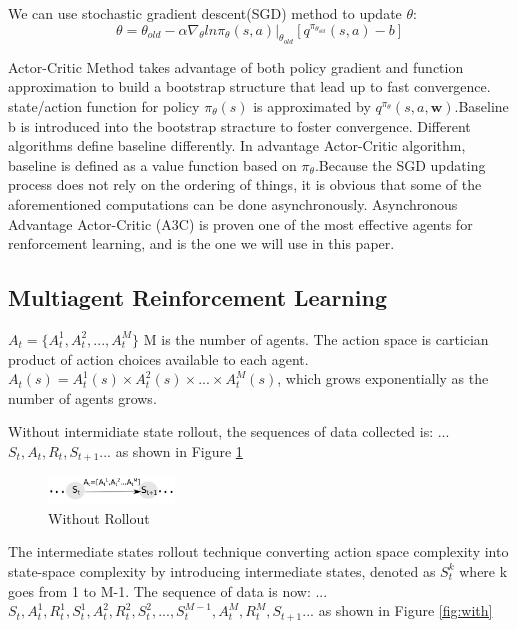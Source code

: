 \documentclass[journal]{IEEEtran}
\begin{document}
We can use stochastic gradient descent(SGD) method to update $\theta$:
\begin{equation}
    \theta=\theta_{old}-\alpha \nabla_{\theta}ln\pi_{\theta}(s,a)|_{\theta_{old}}[q^{\pi_{\theta_{old}}}(s,a)-b]
\end{equation}

Actor-Critic Method takes advantage of both policy gradient and function approximation to build a bootstrap structure that lead up to fast convergence. state/action function for policy $\pi_{\theta}(s)$ is approximated by $q^{\pi_{\theta}}(s,a,\textbf{w})$.Baseline b is introduced into the bootstrap stracture to foster convergence. Different algorithms define baseline differently. In advantage Actor-Critic algorithm, baseline is defined as a value function based on $\pi_{\theta}$.Because the SGD updating process does not rely on the ordering of things, it is obvious that some of the aforementioned computations can be done asynchronously. Asynchronous Advantage Actor-Critic (A3C) is proven one of the most effective agents for renforcement learning, and is the one we will use in this paper.

\subsection{Multiagent Reinforcement Learning}
$A_t=\{A_t^1,A_t^2,...,A_t^M\}$ M is the number of agents. The action space is cartician product of action choices available to each agent. $A_t(s)=A_t^1(s) \times A_t^2(s) \times ... \times A_t^M(s)$, which grows exponentially as the number of agents grows.


Without intermidiate state rollout, the sequences of data collected is:
...$S_t, A_t, R_t, S_{t+1}$... as shown in Figure \ref{fig:without}

\begin{figure}[H]
\centering
\includegraphics[width=0.3\textwidth]{without.png}
\caption{Without Rollout}
\label{fig:without}
\end{figure}

The intermediate states rollout technique converting action space complexity into state-space complexity by introducing intermediate states, denoted as $S_t^k$ where k goes from 1 to M-1. The sequence of data is now: ...$S_t,A_t^1,R_t^1,S_t^1,A_t^2,R_t^2, S_t^2, ... , S_t^{M-1},A_t^M,R_t^M,S_{t+1}$... as shown in Figure \ref{fig:with}
\end{document}
